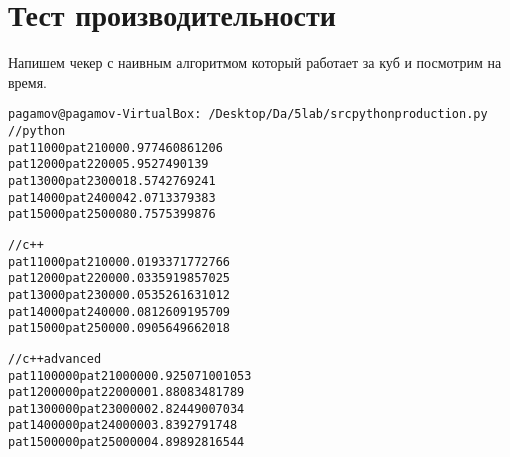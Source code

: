 \section{Тест производительности}

Напишем чекер с наивным алгоритмом который работает за куб и посмотрим на время.

\begin{alltt}
pagamov@pagamov-VirtualBox:~/Desktop/Da/5lab/src python production.py 
// python
pat1 1000 pat2 1000 0.977460861206
pat1 2000 pat2 2000 5.9527490139
pat1 3000 pat2 3000 18.5742769241
pat1 4000 pat2 4000 42.0713379383
pat1 5000 pat2 5000 80.7575399876

// c++
pat1 1000 pat2 1000 0.0193371772766
pat1 2000 pat2 2000 0.0335919857025
pat1 3000 pat2 3000 0.0535261631012
pat1 4000 pat2 4000 0.0812609195709
pat1 5000 pat2 5000 0.0905649662018

// c++ advanced
pat1 100000 pat2 100000 0.925071001053
pat1 200000 pat2 200000 1.88083481789
pat1 300000 pat2 300000 2.82449007034
pat1 400000 pat2 400000 3.8392791748
pat1 500000 pat2 500000 4.89892816544
\end{alltt}
\pagebreak
